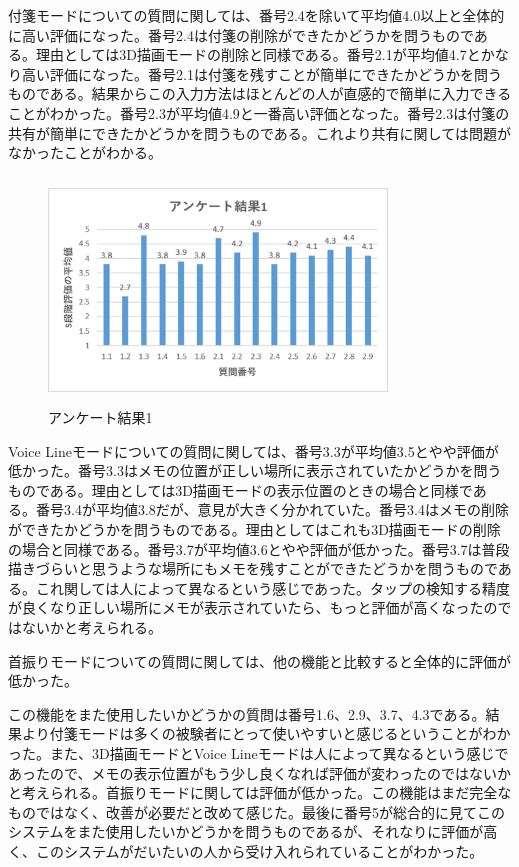 \documentclass[technicalreport]{ieicej}
\begin{document}
付箋モードについての質問に関しては、番号2.4を除いて平均値4.0以上と全体的に高い評価になった。番号2.4は付箋の削除ができたかどうかを問うものである。理由としては3D描画モードの削除と同様である。番号2.1が平均値4.7とかなり高い評価になった。番号2.1は付箋を残すことが簡単にできたかどうかを問うものである。結果からこの入力方法はほとんどの人が直感的で簡単に入力できることがわかった。番号2.3が平均値4.9と一番高い評価となった。番号2.3は付箋の共有が簡単にできたかどうかを問うものである。これより共有に関しては問題がなかったことがわかる。

\begin{figure}[h]
  \begin{center}
    \includegraphics[clip,height=6.0cm,width=9.0cm]{./question1.eps}
    \caption{アンケート結果1}
    \label{fig:question1}
  \end{center}
\end{figure}

Voice Lineモードについての質問に関しては、番号3.3が平均値3.5とやや評価が低かった。番号3.3はメモの位置が正しい場所に表示されていたかどうかを問うものである。理由としては3D描画モードの表示位置のときの場合と同様である。番号3.4が平均値3.8だが、意見が大きく分かれていた。番号3.4はメモの削除ができたかどうかを問うものである。理由としてはこれも3D描画モードの削除の場合と同様である。番号3.7が平均値3.6とやや評価が低かった。番号3.7は普段描きづらいと思うような場所にもメモを残すことができたどうかを問うものである。これ関しては人によって異なるという感じであった。タップの検知する精度が良くなり正しい場所にメモが表示されていたら、もっと評価が高くなったのではないかと考えられる。

首振りモードについての質問に関しては、他の機能と比較すると全体的に評価が低かった。

この機能をまた使用したいかどうかの質問は番号1.6、2.9、3.7、4.3である。結果より付箋モードは多くの被験者にとって使いやすいと感じるということがわかった。また、3D描画モードとVoice Lineモードは人によって異なるという感じであったので、メモの表示位置がもう少し良くなれば評価が変わったのではないかと考えられる。首振りモードに関しては評価が低かった。この機能はまだ完全なものではなく、改善が必要だと改めて感じた。最後に番号5が総合的に見てこのシステムをまた使用したいかどうかを問うものであるが、それなりに評価が高く、このシステムがだいたいの人から受け入れられていることがわかった。
\end{document}

